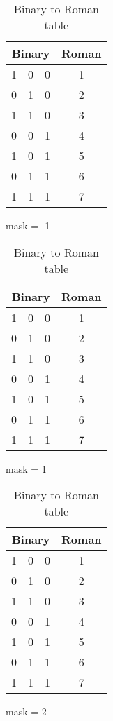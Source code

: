\begin{table}
    \centering
    \begin{subtable}{0.3\textwidth}
        \centering
        \begin{tabular}{|ccc|c|}
            \hline
            \multicolumn{3}{|c|}{Binary} & Roman \\ \hline
            1 & 0 & 0 & 1 \\
            0 & 1 & 0 & 2 \\
            1 & 1 & 0 & 3 \\
            0 & 0 & 1 & 4 \\
            1 & 0 & 1 & 5 \\
            0 & 1 & 1 & 6 \\
            1 & 1 & 1 & 7 \\ \hline
        \end{tabular}    
        \caption{mask = -1}
    \end{subtable}
    \begin{subtable}{0.3\textwidth}
        \centering
        \begin{tabular}{|ccc|c|}
            \hline
            \multicolumn{3}{|c|}{Binary} & Roman \\ \hline
        \rowcolor{light-gray} 1 & 0 & 0 & 1 \\
            0 & 1 & 0 & 2 \\
        \rowcolor{light-gray}    1 & 1 & 0 & 3 \\
            0 & 0 & 1 & 4 \\
        \rowcolor{light-gray}    1 & 0 & 1 & 5 \\
            0 & 1 & 1 & 6 \\
        \rowcolor{light-gray}    1 & 1 & 1 & 7 \\ \hline
        \end{tabular}   
        \caption{mask = 1}
    \end{subtable}    
    \begin{subtable}{0.3\textwidth}
        \centering
        \begin{tabular}{|ccc|c|}
            \hline
            \multicolumn{3}{|c|}{Binary} & Roman \\ \hline
            1 & 0 & 0 & 1 \\
            \rowcolor{light-gray}0 & 1 & 0 & 2 \\
            \rowcolor{light-gray}1 & 1 & 0 & 3 \\
            0 & 0 & 1 & 4 \\
            1 & 0 & 1 & 5 \\
            \rowcolor{light-gray}0 & 1 & 1 & 6 \\
            \rowcolor{light-gray}1 & 1 & 1 & 7 \\ \hline
        \end{tabular}    
        \caption{mask = 2}
    \end{subtable}
    \caption{Binary to Roman table}
    \label{tbl:maskingexample}
\end{table}


